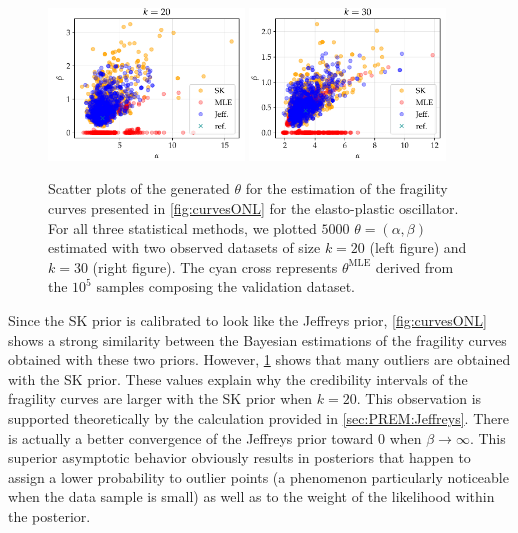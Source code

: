 \begin{figure}[h]
    \centering%
    \includegraphics[width=5.2cm]{figures/PREM/oscill/PGA20scatter.pdf}\hspace*{0.5cm}
    \includegraphics[width=5.2cm]{figures/PREM/oscill/PGA30scatter.pdf}
     \caption{Scatter plots of the generated $\theta$ for the estimation of the fragility curves presented in \cref{fig:curvesONL} for the elasto-plastic oscillator. For all three statistical methods, we plotted $5000$  $\theta=(\alpha,\beta)$ {estimated} with two observed datasets of size $k=20$ (left figure) and $k=30$ (right figure). The cyan cross represents $\theta^{\mathrm{MLE}}$ derived from the $10^5$ samples composing the validation dataset.
     }
    \label{fig:scatterONL}
\end{figure}

Since the SK prior is calibrated to look like the Jeffreys prior, \cref{fig:curvesONL} shows a strong similarity between the Bayesian estimations of the fragility curves obtained with these two priors. However, \cref{fig:scatterONL} shows that many outliers are obtained with the SK prior. These values explain why the credibility intervals of the fragility curves are larger with the SK prior when $k = 20$. This observation is supported theoretically by the calculation provided in \cref{sec:PREM:Jeffreys}. There is actually a better convergence of the Jeffreys prior toward $0$ when $\beta\to\infty$. This superior asymptotic behavior obviously results in posteriors that happen to assign a lower probability to outlier points (a phenomenon particularly noticeable when the data sample is small) as well as to the weight of the likelihood within the posterior.

